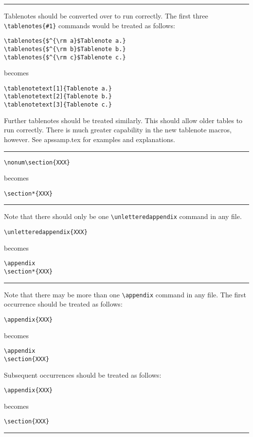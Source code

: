   \smallskip \hrule  \smallskip
Tablenotes should be converted over to run correctly. The first three
\verb+\tablenotes{#1}+ commands would be treated as follows:
\begin{verbatim}
\tablenotes{$^{\rm a}$Tablenote a.}
\tablenotes{$^{\rm b}$Tablenote b.}
\tablenotes{$^{\rm c}$Tablenote c.}
\end{verbatim}
becomes
\begin{verbatim}
\tablenotetext[1]{Tablenote a.}
\tablenotetext[2]{Tablenote b.}
\tablenotetext[3]{Tablenote c.}
\end{verbatim}
Further tablenotes should be treated similarly.
This should allow older tables to run correctly. There is much greater
capability in the new tablenote macros, however. See apssamp.tex for
examples and explanations.
  \smallskip \hrule  \smallskip
\begin{verbatim}
\nonum\section{XXX}
\end{verbatim}
  becomes
\begin{verbatim}
\section*{XXX}
\end{verbatim}
  \smallskip \hrule  \smallskip
Note that there should only be one \verb+\unletteredappendix+
command in any file.
\begin{verbatim}
\unletteredappendix{XXX}
\end{verbatim}
  becomes
\begin{verbatim}
\appendix
\section*{XXX}
\end{verbatim}
  \smallskip \hrule  \smallskip
Note that there may be more than one \verb+\appendix+
command in any file. The first occurrence should be treated as follows:
\begin{verbatim}
\appendix{XXX}
\end{verbatim}
  becomes
\begin{verbatim}
\appendix
\section{XXX}
\end{verbatim}
Subsequent occurrences should be treated as follows:
\begin{verbatim}
\appendix{XXX}
\end{verbatim}
  becomes
\begin{verbatim}
\section{XXX}
\end{verbatim}
\nobreak  \smallskip \hrule \nobreak \smallskip

